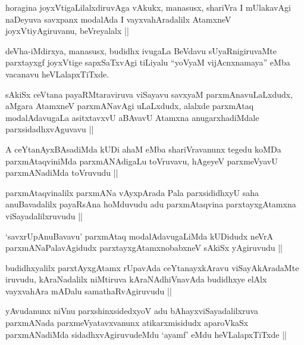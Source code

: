 \begin{artha}
horagina joyxVtigaLilalxdiruvAga vAkukx, manasusx, shariVra I mUlakavAgi naDeyuva savxpanx modalAda I vayxvahAradalilx AtamxneV joyxVtiyAgiruvanu, beVreyalalx ||
\end{artha}

\begin{artha}
deVha-iMdirxya, manasusx, budidhx ivugaLa BeVdavu sUyaRnigiruvaMte parxtayxgf joyxVtige sapxSaTxvAgi tiLiyalu ``yoV\s yaM vijAcnxnamaya'' eMba vacanavu heVLalapxTiTxde.
\end{artha}

\begin{artha}
sAkiSx ceVtana payaRMtaraviruva viSayavu savxyaM parxmAnavuLaLxdudx, aMgara AtamxneV parxmANavAgi uLaLxdudx, alalxde parxmAtaq modalAdavugaLa asitxtavxvU aBAvavU Atamxna anugarxhadiMdale parxsidadhxvAguvavu ||
\end{artha}

\begin{artha}
A ceYtanAyxBAsadiMda kUDi ahaM eMba shariVravanunx tegedu koMDa parxmAtaqviniMda parxmANAdigaLu toVruvavu, hAgeyeV parxmeVyavU parxmANadiMda toVruvudu ||
\end{artha}

\begin{artha}
parxmAtaqvinalilx parxmANa vAyxpArada Pala parxsididhxyU saha anuBavadalilx payaRsAna hoMduvudu adu parxmAtaqvina parxtayxgAtamxna viSayadalilxruvudu ||
\end{artha}

\begin{artha}
`savxrUpAnuBavavu' parxmAtaq modalAdavugaLiMda kUDidudx neVrA parxmANaPalavAgidudx parxtayxgAtamxnobabxneV sAkiSx yAgiruvudu ||
\end{artha}

\begin{artha}
budidhxyalilx parxtAyxgAtamx rUpavAda ceYtanayxkAravu viSayAkAradaMte iruvudu, kAraNadalilx niMtiruva kAraNAdhiVnavAda budidhxye elAlx vayxvahAra mADalu samathaRvAgiruvudu ||
\end{artha}

\begin{artha}
yAvudanunx niVnu parxshinxsidedxyoV adu bAhayxviSayadalilxruva parxmANada parxmeVyatavxvanunx atikarxmisidudx aparoVkaSx parxmANadiMda sidadhxvAgiruvudeMdu `ayamf' eMdu heVLalapxTiTxde ||
\end{artha}

